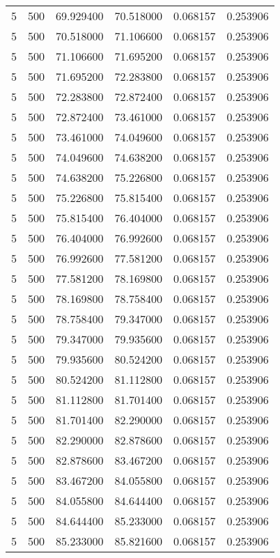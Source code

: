 \begin{longtable}{rrrrrr}
5 & 500 & 69.929400 & 70.518000 & 0.068157 & 0.253906 \\
5 & 500 & 70.518000 & 71.106600 & 0.068157 & 0.253906 \\
5 & 500 & 71.106600 & 71.695200 & 0.068157 & 0.253906 \\
5 & 500 & 71.695200 & 72.283800 & 0.068157 & 0.253906 \\
5 & 500 & 72.283800 & 72.872400 & 0.068157 & 0.253906 \\
5 & 500 & 72.872400 & 73.461000 & 0.068157 & 0.253906 \\
5 & 500 & 73.461000 & 74.049600 & 0.068157 & 0.253906 \\
5 & 500 & 74.049600 & 74.638200 & 0.068157 & 0.253906 \\
5 & 500 & 74.638200 & 75.226800 & 0.068157 & 0.253906 \\
5 & 500 & 75.226800 & 75.815400 & 0.068157 & 0.253906 \\
5 & 500 & 75.815400 & 76.404000 & 0.068157 & 0.253906 \\
5 & 500 & 76.404000 & 76.992600 & 0.068157 & 0.253906 \\
5 & 500 & 76.992600 & 77.581200 & 0.068157 & 0.253906 \\
5 & 500 & 77.581200 & 78.169800 & 0.068157 & 0.253906 \\
5 & 500 & 78.169800 & 78.758400 & 0.068157 & 0.253906 \\
5 & 500 & 78.758400 & 79.347000 & 0.068157 & 0.253906 \\
5 & 500 & 79.347000 & 79.935600 & 0.068157 & 0.253906 \\
5 & 500 & 79.935600 & 80.524200 & 0.068157 & 0.253906 \\
5 & 500 & 80.524200 & 81.112800 & 0.068157 & 0.253906 \\
5 & 500 & 81.112800 & 81.701400 & 0.068157 & 0.253906 \\
5 & 500 & 81.701400 & 82.290000 & 0.068157 & 0.253906 \\
5 & 500 & 82.290000 & 82.878600 & 0.068157 & 0.253906 \\
5 & 500 & 82.878600 & 83.467200 & 0.068157 & 0.253906 \\
5 & 500 & 83.467200 & 84.055800 & 0.068157 & 0.253906 \\
5 & 500 & 84.055800 & 84.644400 & 0.068157 & 0.253906 \\
5 & 500 & 84.644400 & 85.233000 & 0.068157 & 0.253906 \\
5 & 500 & 85.233000 & 85.821600 & 0.068157 & 0.253906 \\

\end{longtable}
